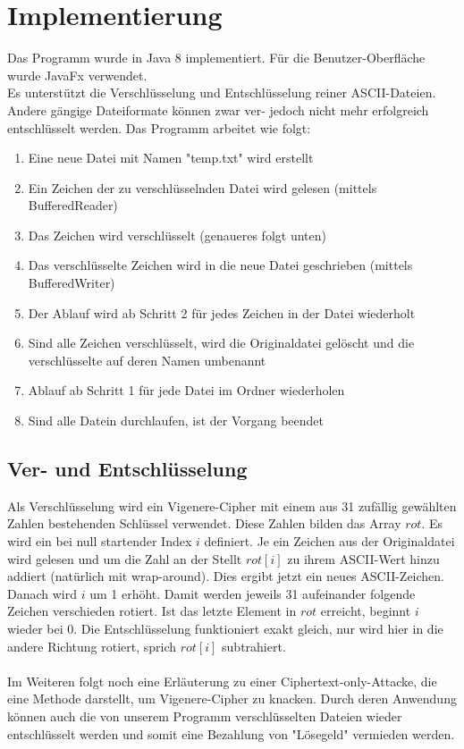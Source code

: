 \documentclass[12pt, a4paper]{article}
\begin{document}
\section{Implementierung}
Das Programm wurde in Java 8 implementiert. Für die Benutzer-Oberfläche wurde JavaFx verwendet.\\
Es unterstützt die Verschlüsselung und Entschlüsselung reiner ASCII-Dateien. Andere gängige Dateiformate können zwar ver- jedoch nicht mehr erfolgreich entschlüsselt werden.
Das Programm arbeitet wie folgt:
\begin{enumerate}
	\item Eine neue Datei mit Namen "temp.txt" wird erstellt
	\item Ein Zeichen der zu verschlüsselnden Datei wird gelesen (mittels BufferedReader)
	\item Das Zeichen wird verschlüsselt (genaueres folgt unten)
	\item Das verschlüsselte Zeichen wird in die neue Datei geschrieben (mittels BufferedWriter)
	\item Der Ablauf wird ab Schritt 2 für jedes Zeichen in der Datei wiederholt
	\item Sind alle Zeichen verschlüsselt, wird die Originaldatei gelöscht und die verschlüsselte auf deren Namen umbenannt
	\item Ablauf ab Schritt 1 für jede Datei im Ordner wiederholen
	\item Sind alle Datein durchlaufen, ist der Vorgang beendet
\end{enumerate}

\subsection{Ver- und Entschlüsselung}
Als Verschlüsselung wird ein Vigenere-Cipher mit einem aus 31 zufällig gewählten Zahlen bestehenden Schlüssel verwendet. Diese Zahlen bilden das Array $rot$. Es wird ein bei  null startender Index $i$ definiert. Je ein Zeichen aus der Originaldatei wird gelesen und um die Zahl an der Stellt $rot[i]$ zu ihrem ASCII-Wert hinzu addiert (natürlich mit wrap-around). Dies ergibt jetzt ein neues ASCII-Zeichen. Danach wird $i$ um 1 erhöht. Damit werden jeweils 31 aufeinander folgende Zeichen verschieden rotiert. Ist das letzte Element in $rot$ erreicht, beginnt $i$ wieder bei 0.
Die Entschlüsselung funktioniert exakt gleich, nur wird hier in die andere Richtung rotiert, sprich $rot[i]$ subtrahiert.
\\
\\
Im Weiteren folgt noch eine Erläuterung zu einer Ciphertext-only-Attacke, die eine Methode darstellt, um Vigenere-Cipher zu knacken. Durch deren Anwendung können auch die von unserem Programm verschlüsselten Dateien wieder entschlüsselt werden und somit eine Bezahlung von "Lösegeld" vermieden werden.
\end{document}
